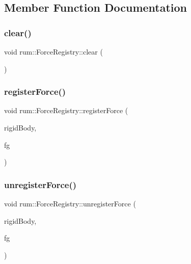 \subsection{Member Function Documentation}
\mbox{\label{classrum_1_1_force_registry_a74b9f08c0fb87c8b49125fb98b6c347a}} 
\subsubsection{\texorpdfstring{clear()}{clear()}}
{\footnotesize\ttfamily void rum\+::\+Force\+Registry\+::clear (\begin{DoxyParamCaption}{ }\end{DoxyParamCaption})}

\mbox{\label{classrum_1_1_force_registry_a8aa91bdec15bc2f06f8fa331f7418c92}} 
\subsubsection{\texorpdfstring{register\+Force()}{registerForce()}}
{\footnotesize\ttfamily void rum\+::\+Force\+Registry\+::register\+Force (\begin{DoxyParamCaption}\item[{\mbox{\hyperlink{classrum_1_1_rigid_body}{Rigid\+Body}} $\ast$}]{rigid\+Body,  }\item[{\mbox{\hyperlink{classrum_1_1_force_generator}{Force\+Generator}} $\ast$}]{fg }\end{DoxyParamCaption})}

\mbox{\label{classrum_1_1_force_registry_ab4e2467560453bfbb700fdff9eee02ad}} 
\subsubsection{\texorpdfstring{unregister\+Force()}{unregisterForce()}}
{\footnotesize\ttfamily void rum\+::\+Force\+Registry\+::unregister\+Force (\begin{DoxyParamCaption}\item[{\mbox{\hyperlink{classrum_1_1_rigid_body}{Rigid\+Body}} $\ast$}]{rigid\+Body,  }\item[{\mbox{\hyperlink{classrum_1_1_force_generator}{Force\+Generator}} $\ast$}]{fg }\end{DoxyParamCaption})}

